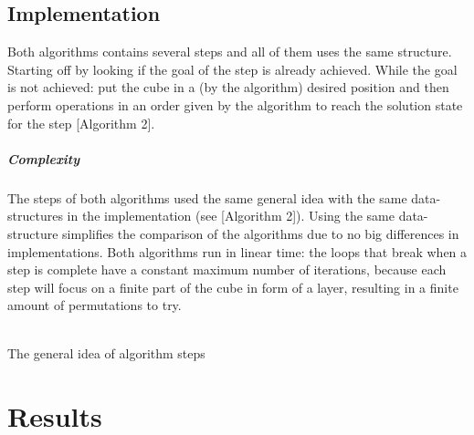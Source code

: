 \documentclass[a4paper,11pt]{kth-mag}
\begin{document}
\section{Implementation}
	Both algorithms contains several steps and all of them uses the same structure. Starting off by looking if the goal of the step is already achieved. While the goal is not achieved: put the cube in a (by the algorithm) desired position and then perform operations in an order given by the algorithm to reach the solution state for the step [Algorithm 2].
	\raggedbottom
	\paragraph{Complexity} The steps of both algorithms used the same general idea with the same data-structures in the implementation (see [Algorithm 2]). Using the same data-structure simplifies the comparison of the algorithms due to no big differences in implementations. Both algorithms run in linear time: the loops that break when a step is complete have a constant maximum number of iterations, because each step will focus on a finite part of the cube in form of a layer, resulting in a finite amount of permutations to try.\\\\
	\begin{algorithm}[H]
	\caption{The general idea of algorithm steps}
	\end{algorithm}

	
\chapter{Results}
\end{document}
